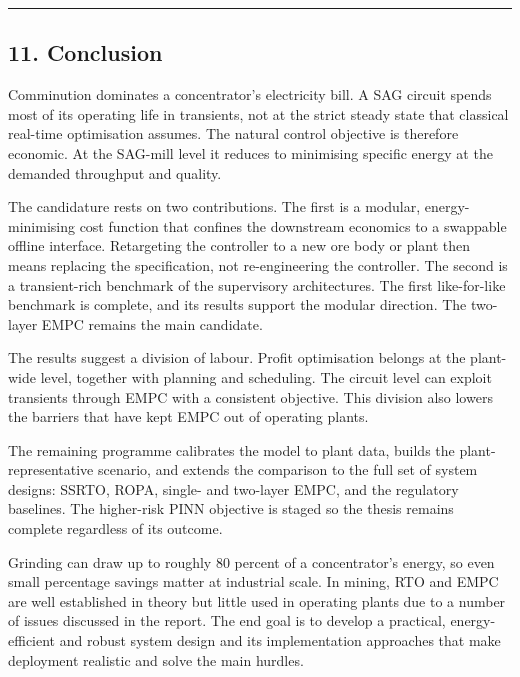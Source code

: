 \documentclass[
  14pt,
]{extarticle}
\begin{document}
\begin{center}\rule{0.5\linewidth}{0.5pt}\end{center}

\newpage

\subsection{11. Conclusion}\label{conclusion}


Comminution dominates a concentrator's electricity bill. A SAG circuit
spends most of its operating life in transients, not at the strict
steady state that classical real-time optimisation assumes. The natural
control objective is therefore economic. At the SAG-mill level it
reduces to minimising specific energy at the demanded throughput and
quality.

The candidature rests on two contributions. The first is a modular,
energy-minimising cost function that confines the downstream economics
to a swappable offline interface. Retargeting the controller to a new
ore body or plant then means replacing the specification, not
re-engineering the controller. The second is a transient-rich benchmark
of the supervisory architectures. The first like-for-like benchmark is
complete, and its results support the modular direction. The two-layer
EMPC remains the main candidate.

The results suggest a division of labour. Profit optimisation belongs at
the plant-wide level, together with planning and scheduling. The circuit
level can exploit transients through EMPC with a consistent objective.
This division also lowers the barriers that have kept EMPC out of
operating plants.

The remaining programme calibrates the model to plant data, builds the
plant-representative scenario, and extends the comparison to the full
set of system designs: SSRTO, ROPA, single- and two-layer EMPC, and the
regulatory baselines. The higher-risk PINN objective is staged so
the thesis remains complete regardless of its outcome.

Grinding can draw
up to roughly 80 percent of a concentrator's energy, so even small
percentage savings matter at industrial scale. In mining, RTO and EMPC are well
established in theory but little used in operating plants due to a
number of issues discussed in the report. The end goal is to develop a
practical, energy-efficient and robust system design and its
implementation approaches that make deployment realistic and solve the
main hurdles.
\end{document}
